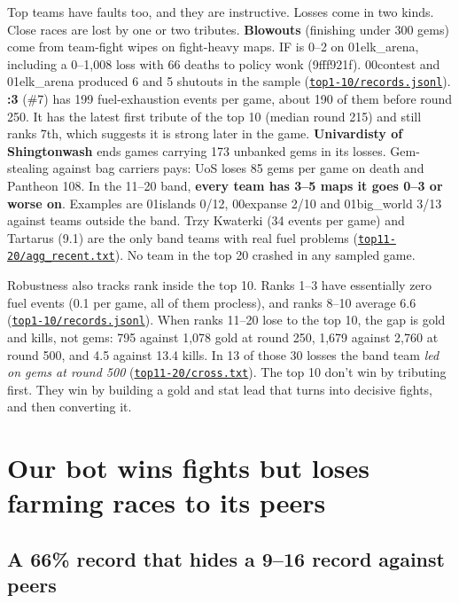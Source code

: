 \documentclass[11pt,a4paper]{article}
\newcommand{\scratch}{file:///private/tmp/claude-501/-Users-tristanbasri-Desktop-Code-cambridge-battlecode-s2/b3f4cb6b-e46a-405f-957c-42c44c05c8dc/scratchpad/ladder-data}
\newcommand{\src}[2]{{\small(\href{#1}{\textcolor{cTop}{\texttt{#2}}})}}
\begin{document}
Top teams have faults too, and they are instructive. Losses come in two kinds. Close races are lost by one or two tributes. \textbf{Blowouts} (finishing under 300 gems) come from team-fight wipes on fight-heavy maps. IF is 0--2 on 01elk\_arena, including a 0--1,008 loss with 66 deaths to policy wonk (9fff921f). 00contest and 01elk\_arena produced 6 and 5 shutouts in the sample \src{\scratch/top1-10/records.jsonl}{top1-10/records.jsonl}. \textbf{:3} (\#7) has 199 fuel-exhaustion events per game, about 190 of them before round 250. It has the latest first tribute of the top 10 (median round 215) and still ranks 7th, which suggests it is strong later in the game. \textbf{Univardisty of Shingtonwash} ends games carrying 173 unbanked gems in its losses. Gem-stealing against bag carriers pays: UoS loses 85 gems per game on death and Pantheon 108. In the 11--20 band, \textbf{every team has 3--5 maps it goes 0--3 or worse on}. Examples are 01islands 0/12, 00expanse 2/10 and 01big\_world 3/13 against teams outside the band. Trzy Kwaterki (34 events per game) and Tartarus (9.1) are the only band teams with real fuel problems \src{\scratch/top11-20/agg_recent.txt}{top11-20/agg\_recent.txt}. No team in the top 20 crashed in any sampled game.

Robustness also tracks rank inside the top 10. Ranks 1--3 have essentially zero fuel events (0.1 per game, all of them procless), and ranks 8--10 average 6.6 \src{\scratch/top1-10/records.jsonl}{top1-10/records.jsonl}. When ranks 11--20 lose to the top 10, the gap is gold and kills, not gems: 795 against 1,078 gold at round 250, 1,679 against 2,760 at round 500, and 4.5 against 13.4 kills. In 13 of those 30 losses the band team \emph{led on gems at round 500} \src{\scratch/top11-20/cross.txt}{top11-20/cross.txt}. The top 10 don't win by tributing first. They win by building a gold and stat lead that turns into decisive fights, and then converting it.

\section{Our bot wins fights but loses farming races to its peers}

\subsection{A 66\% record that hides a 9--16 record against peers}
\end{document}
